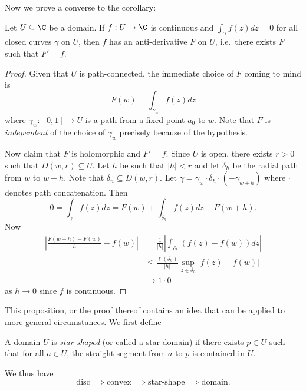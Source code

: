 \documentclass[a4paper]{article}
\begin{document}
Now we prove a converse to the corollary:

\begin{proposition}
  \label{prop:existence of anti-derivative}
  Let \(U \subseteq \C\) be a domain. If \(f: U \to \C\) is continuous and \(\int_\gamma f(z)dz = 0\) for all closed curves \(\gamma\) on \(U\), then \(f\) has an anti-derivative \(F\) on \(U\), i.e.\ there exists \(F\) such that \(F' = f\).
\end{proposition}

\begin{proof}
  Given that \(U\) is path-connected, the immediate choice of \(F\) coming to mind is
  \[
    F(w) = \int_{\gamma_w} f(z)dz
  \]
  where \(\gamma_w: [0, 1] \to U\) is a path from a fixed point \(a_0\) to \(w\). Note that \(F\) is \emph{independent} of the choice of \(\gamma_w\) precisely because of the hypothesis.

  Now claim that \(F\) is holomorphic and \(F' = f\). Since \(U\) is open, there exists \(r > 0\) such that \(D(w, r) \subseteq U\). Let \(h\) be such that \(|h| < r\) and let \(\delta_h\) be the radial path from \(w\) to \(w + h\). Note that \(\delta_n \subseteq D(w, r)\). Let \(\gamma = \gamma_w \cdot \delta_h \cdot (-\gamma_{w + h})\) where \(\cdot\) denotes path concatenation. Then
  \[
    0 = \int_\gamma f(z) dz = F(w) + \int_{\delta_h} f(z)dz - F(w + h).
  \]
  Now
  \begin{align*}
    \left| \frac{F(w + h) - F(w)}{h} - f(w) \right|
    &= \frac{1}{|h|} \left| \int_{\delta_h} (f(z) - f(w)) dz \right| \\
    &\leq \frac{\ell(\delta_h)}{|h|} \sup_{z \in \delta_h} |f(z) - f(w)| \\
    &\to 1 \cdot 0
  \end{align*}
  as \(h \to 0\) since \(f\) is continuous.
\end{proof}

This proposition, or the proof thereof contains an idea that can be applied to more general circumstances. We first define

\begin{definition}
  A domain \(U\) is \emph{star-shaped} (or called a star domain) if there exists \(p \in U\) such that for all \(a \in U\), the straight segment from \(a\) to \(p\) is contained in \(U\).
\end{definition}

We thus have
\[
  \text{disc} \implies \text{convex} \implies \text{star-shape} \implies \text{domain}.
\]
\end{document}
